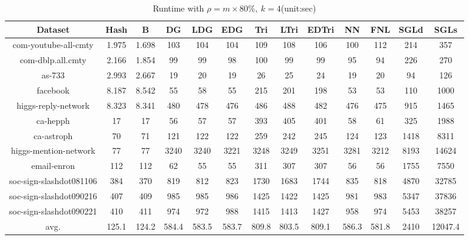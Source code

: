 \documentclass{sig-alternate-2013}
\begin{document}
\begin{table*}[!hpp]
\centering
\caption{Runtime with $\rho = m\times 80\%,\ k=4$(unit:sec)}
\begin{tabular}{ccccccccccccc}
\hline
Dataset                     &Hash       &B          &DG         &LDG        &EDG        &Tri        &LTri       &EDTri      &NN         &FNL        &SGLd   &SGLs\\
\hline
com-youtube-all-cmty		&1.975		&1.698		&103		&104		&104		&109		&108		&106		&100		&112		&214		&357\\
com-dblp.all.cmty			&2.166		&1.854		&99 		&99		    &98		    &100		&99   		&99   		&95   		&94		    &226		&270\\
as-733						&2.993		&2.667		&19	    	&20		    &19		    &26  		&25		    &24		    &19		    &20		    &94		    &126\\
facebook					&8.187		&8.542		&55		    &58		    &55		    &215		&201		&198		&53		    &53	     	&110		&1000\\
higgs-reply-network			&8.323		&8.341		&480		&478		&476		&486		&488		&482		&476		&475		&915		&1465\\
ca-hepph		            &17	      	&17    		&56		    &57		    &57		    &393		&405		&401		&58		    &61		    &325  		&1988\\
ca-astroph		            &70		    &71		    &121		&122		&122		&259		&242		&245		&124		&123		&1418		&8311\\
higgs-mention-network		&77		    &77		    &3240		&3240		&3221		&3248		&3249		&3251		&3281		&3212		&8193		&14624\\
email-enron		            &112		&112		&62		    &55		    &55		    &311		&307		&307		&56		    &56	     	&1755		&7550\\
soc-sign-slashdot081106		&384		&370		&819		&812		&823		&1730		&1683		&1744		&835		&818		&4870		&32785\\
soc-sign-slashdot090216		&407		&409		&985		&985		&986		&1425		&1422		&1425		&981		&983		&5347		&37836\\
soc-sign-slashdot090221		&410		&411		&974		&972		&988		&1415		&1413		&1427		&958		&974		&5453		&38257\\
\hline
avg.                        &125.1	    &124.2   	&584.4	    &583.5  	&583.7     	&809.8	    &803.5	    &809.1	    &586.3	    &581.8	    &2410	    &12047.4\\
\hline
\end{tabular}
\end{table*}
\end{document}
